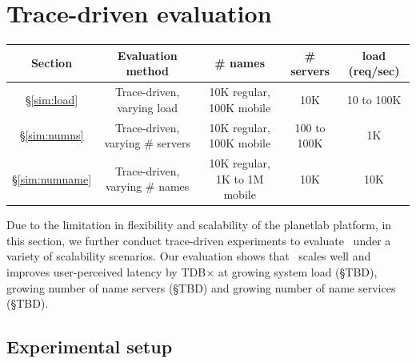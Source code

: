 
\section{Trace-driven evaluation}


\begin{table}[t]
\centering
\small{
\begin{tabular}{c|c|c|c|c}
{\bf Section} & {\bf Evaluation method} & {\bf \# names} & {\bf \# servers} & {\bf load (req/sec)} \\ \hline
\S \ref{sim:load} & Trace-driven, varying load & 10K regular, 100K mobile & 10K & 10 to 100K \\ \hline
\S \ref{sim:numns} & Trace-driven, varying \# servers & 10K regular, 100K mobile &  100 to 100K & 1K \\ \hline
\S \ref{sim:numname} & Trace-driven, varying \# names & 10K regular, 1K to 1M mobile & 10K & 10K\\ \hline
\end{tabular}
}
\end{table}


Due to the limitation in flexibility and scalability of the planetlab platform, in this section, we further conduct trace-driven experiments to evaluate \auspice\ under a variety of scalability scenarios. Our evaluation shows that \auspice\ scales well and improves user-perceived latency by TDB$\times$ at growing system load (\S TBD), growing number of name servers (\S TBD) and growing number of name services (\S TBD).
 
\subsection{Experimental setup}

